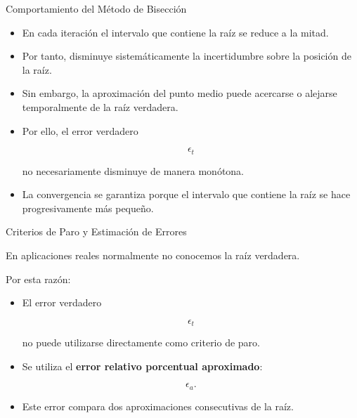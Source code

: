 \documentclass[../../main.tex]{subfiles}
\begin{document}
\begin{frame}{Comportamiento del Método de Bisección}

\begin{itemize}

    \item En cada iteración el intervalo que contiene la raíz se reduce a la mitad.

    \item Por tanto, disminuye sistemáticamente la incertidumbre sobre la posición de la raíz.

    \item Sin embargo, la aproximación del punto medio puede acercarse o alejarse temporalmente de la raíz verdadera.

    \item Por ello, el error verdadero

    \[
    \epsilon_t
    \]

    no necesariamente disminuye de manera monótona.

    \item La convergencia se garantiza porque el intervalo que contiene la raíz se hace progresivamente más pequeño.

\end{itemize}

\end{frame}



\begin{frame}{Criterios de Paro y Estimación de Errores}

En aplicaciones reales normalmente no conocemos la raíz verdadera.

Por esta razón:

\begin{itemize}

    \item El error verdadero

    \[
    \epsilon_t
    \]

    no puede utilizarse directamente como criterio de paro.

    \item Se utiliza el \textbf{error relativo porcentual aproximado}:

    \[
    \epsilon_a.
    \]

    \item Este error compara dos aproximaciones consecutivas de la raíz.

\end{itemize}

\end{frame}
\end{document}

